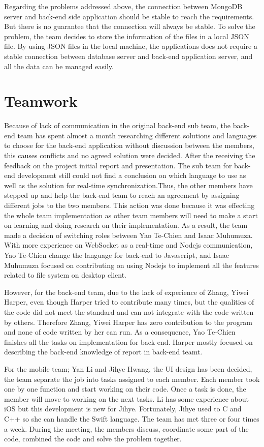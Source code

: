 \documentclass{article}
\begin{document}
Regarding the problems addressed above, the connection between MongoDB server and back-end side application should be stable to reach the requirements. But there is no guarantee that the connection will always be stable. To solve the problem, the team decides to store the information of the files in a local JSON file. By using JSON files in the local machine, the applications does not require a stable connection between database server and back-end application server, and all the data can be managed easily.

\section{Teamwork}
Because of lack of communication in the original back-end sub team, the back-end team has spent almost a month researching different solutions and languages to choose for the back-end application without discussion between the members, this causes conflicts and no agreed solution were decided. After the receiving the feedback on the project initial report and presentation. The sub team for back-end development still could not find a conclusion on which language to use as well as the solution for real-time synchronization.Thus, the other members have stepped up and help the back-end team to reach an agreement by assigning different jobs to the two members. This action was done because it was effecting the whole team implementation as other team members will need to make a start on learning and doing research on their implementation. As a result, the team made a decision of switching roles between Yao Te-Chien and Isaac Muhumuza. With more experience on WebSocket as a real-time and Nodejs communication, Yao Te-Chien change the language for back-end to Javascript, and Isaac Muhumuza focused on contributing on using Nodejs to implement all the features related to file system on desktop client.

However, for the back-end team, due to the lack of experience of Zhang, Yiwei Harper, even though Harper tried to contribute many times, but the qualities of the code did not meet the standard and can not integrate with the code written by others. Therefore Zhang, Yiwei Harper has zero contribution to the program and none of code written by her can run. As a consequence, Yao Te-Chien finishes all the tasks on implementation for back-end. Harper mostly focused on describing the back-end knowledge of report in back-end teamt. 

For the mobile team; Yan Li and Jihye Hwang, the UI design has been decided, the team separate the job into tasks assigned to each member. Each member took one by one function and start working on their code. Once a task is done, the member will move to working on the next tasks. Li has some experience about iOS but this development is new for Jihye. Fortunately, Jihye used to C and C++ so she can handle the Swift language. The team has met three or four times a week. During the meeting, the members discuss, coordinate some part of the code, combined the code and solve the problem together.
\end{document}
